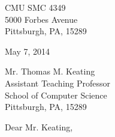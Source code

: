 \documentclass{article}
\begin{document}
\noindent
CMU SMC 4349\\
5000 Forbes Avenue\\
Pittsburgh, PA, 15289

\vspace{1em}

\noindent
May 7, 2014

\vspace{1em}

\noindent
Mr. Thomas M. Keating\\
Assistant Teaching Professor\\
School of Computer Science\\
Pittsburgh, PA, 15289

\vspace{1em}

\noindent
Dear Mr. Keating,


\vspace{1em}



\tableofcontents





\end{document}
